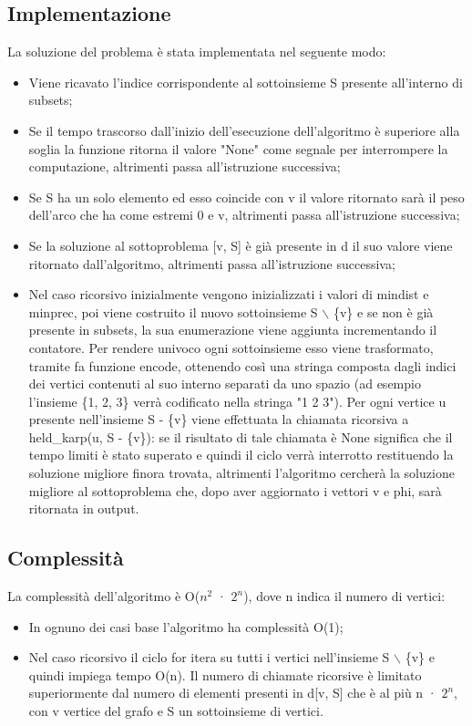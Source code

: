 \subsection{Implementazione}
La soluzione del problema è stata implementata nel seguente modo:
\begin{itemize}
	\item Viene ricavato l'indice corrispondente al sottoinsieme S presente all'interno di subsets;
	\item Se il tempo trascorso dall'inizio dell'esecuzione dell'algoritmo è superiore alla soglia la funzione ritorna il valore "None" come segnale per interrompere la computazione, altrimenti passa all'istruzione successiva;
	\item Se S ha un solo elemento ed esso coincide con v il valore ritornato sarà il peso dell'arco che ha come estremi 0 e v, altrimenti passa all'istruzione successiva;
	\item Se la soluzione al sottoproblema [v, S] è già presente in d il suo valore viene ritornato dall'algoritmo, altrimenti passa all'istruzione successiva;
	\item Nel caso ricorsivo inizialmente vengono inizializzati i valori di mindist e minprec, poi viene costruito il nuovo sottoinsieme S $\backslash$ \{v\} e se non è già presente in subsets, la sua enumerazione viene aggiunta incrementando il contatore. Per rendere univoco ogni sottoinsieme esso viene trasformato, tramite fa funzione encode, ottenendo così una stringa composta dagli indici dei vertici contenuti al suo interno separati da uno spazio (ad esempio l'insieme \{1, 2, 3\} verrà codificato nella stringa "1 2 3"). Per ogni vertice u presente nell'insieme S - \{v\} viene effettuata la chiamata ricorsiva a held\_karp(u, S - \{v\}): se il risultato di tale chiamata è None significa che il tempo limiti è stato superato e quindi il ciclo verrà interrotto restituendo la soluzione migliore finora trovata, altrimenti l'algoritmo cercherà la soluzione migliore al sottoproblema che, dopo aver aggiornato i vettori v e phi, sarà ritornata in output.
\end{itemize}


\subsection{Complessità}
La complessità dell'algoritmo è O($n^2$ · $2^n$), dove n indica il numero di vertici:
\begin{itemize}
	\item In ognuno dei casi base l'algoritmo ha complessità O(1);
	\item Nel caso ricorsivo il ciclo for itera su tutti i vertici nell'insieme S $\backslash$ \{v\} e quindi impiega tempo O(n). Il numero di chiamate ricorsive è limitato superiormente dal numero di elementi presenti in d[v, S] che è al più n · $2^n$, con v vertice del
	grafo e S un sottoinsieme di vertici. 
\end{itemize}
\pagebreak